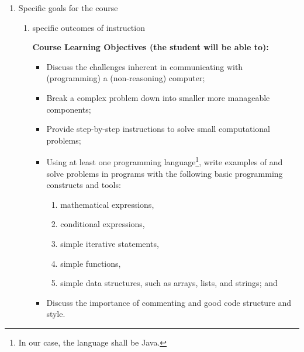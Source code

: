\begin{enumerate}[1.]
\begin{enumerate}[a.]
\item indicate whether a required, elective, or selected elective\\ %
  {\bfseries
    Required\footnote{Some CSC majors can take this option if starting in Engineering and switching to CSC. CSC106 and CSC107 can be substituted for CSC110 and CSC110L.}
  }

\end{enumerate}

\item Specific goals for the course
\begin{enumerate}
\item specific outcomes of instruction\\ %
  {\bfseries
    Course Learning Objectives (the student will be able to):
    \begin{itemize}
    \item Discuss the challenges inherent in communicating with (programming) a 
(non-reasoning) computer;
       \item Break a complex problem down into smaller more manageable components;
       \item Provide step-by-step instructions to solve small computational problems;
       \item Using at least one programming language\footnote{In our case, the language shall be Java.}, 
       write examples of and solve problems in programs with the following basic programming constructs and tools:
       \begin{enumerate}
       \item mathematical expressions,
       \item conditional expressions,
       \item simple iterative statements,
       \item simple functions,
       \item simple data structures, such as arrays, lists, and strings; and
       \end{enumerate}
       \item Discuss the importance of commenting and good code structure and style.
    \end{itemize}
  }


\end{enumerate}
\end{enumerate}
